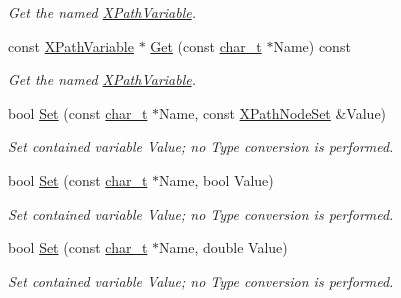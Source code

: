 \begin{DoxyCompactItemize}
\begin{DoxyCompactList}\small\item\em Get the named \hyperlink{classphys_1_1xml_1_1XPathVariable}{XPathVariable}. \item\end{DoxyCompactList}\item 
const \hyperlink{classphys_1_1xml_1_1XPathVariable}{XPathVariable} $\ast$ \hyperlink{classphys_1_1xml_1_1XPathVariableSet_a64274e4889036c318c701614d2cfa5ab}{Get} (const \hyperlink{namespacephys_1_1xml_afc87705cd1c2917d87b879715a2d8f6e}{char\_\-t} $\ast$Name) const 
\begin{DoxyCompactList}\small\item\em Get the named \hyperlink{classphys_1_1xml_1_1XPathVariable}{XPathVariable}. \item\end{DoxyCompactList}\item 
bool \hyperlink{classphys_1_1xml_1_1XPathVariableSet_a61fe3aa60d13a4a224d301456a230a7c}{Set} (const \hyperlink{namespacephys_1_1xml_afc87705cd1c2917d87b879715a2d8f6e}{char\_\-t} $\ast$Name, const \hyperlink{classphys_1_1xml_1_1XPathNodeSet}{XPathNodeSet} \&Value)
\begin{DoxyCompactList}\small\item\em Set contained variable Value; no Type conversion is performed. \item\end{DoxyCompactList}\item 
bool \hyperlink{classphys_1_1xml_1_1XPathVariableSet_af21e7f97081284d98b18562b59299543}{Set} (const \hyperlink{namespacephys_1_1xml_afc87705cd1c2917d87b879715a2d8f6e}{char\_\-t} $\ast$Name, bool Value)
\begin{DoxyCompactList}\small\item\em Set contained variable Value; no Type conversion is performed. \item\end{DoxyCompactList}\item 
bool \hyperlink{classphys_1_1xml_1_1XPathVariableSet_aa713e33048ee463a58b9e6988daab214}{Set} (const \hyperlink{namespacephys_1_1xml_afc87705cd1c2917d87b879715a2d8f6e}{char\_\-t} $\ast$Name, double Value)
\begin{DoxyCompactList}\small\item\em Set contained variable Value; no Type conversion is performed. \item\end{DoxyCompactList}\item 

\end{DoxyCompactItemize}
